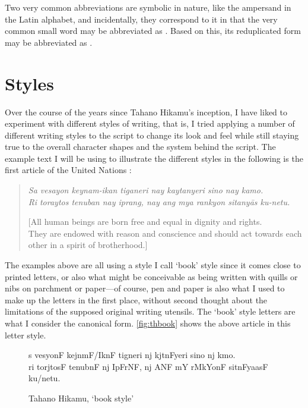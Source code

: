 Two very common abbreviations are symbolic in nature, like the ampersand 
\orth{\&} in the Latin alphabet, and incidentally, they correspond to it in 
that the very common small word  may be abbreviated as 
\rayr{\&}{\&}. Based on this, its reduplicated form 
 may be abbreviated as \ayr{+}.


\section{Styles}

Over the course of the years since Tahano Hikamu's inception, I have liked to 
experiment with different styles of writing, that is, I tried applying a 
number of different writing styles to the script to change its look and feel 
while still staying true to the overall character shapes and the system behind 
the script. The example text I will be using to illustrate the different styles 
in the following is the first article of the United Nations 
:

\blockcquote[Article 1]{udhr}{\textit{Sa vesayon keynam-ikan tiganeri nay
kaytanyeri sino nay kamo.\\
Ri toraytos tenuban nay iprang, nay ang mya rankyon sitanyās ku-netu.}

[All human beings are born free and equal in dignity and rights.\\
They are endowed with reason and conscience and should act towards each other 
in a spirit of brotherhood.]}

The examples above are all using a style I call `book' style since it 
comes close to printed letters, or also what might be conceivable as being 
written with quills or nibs on parchment or paper---of course, pen and paper is 
also what I used to make up the letters in the first place, without second 
thought about the limitations of the supposed original writing utensils. The 
`book' style letters are what I consider the canonical form. 
\autoref{fig:thbook} shows the above article in this letter style.

\begin{figure}[ht]\centering
\caption{Tahano Hikamu, `book style'}
{\Tagati\Large s vesyonF kejnmF/IknF tigneri nj kjtnFyeri sino nj kmo.\\
ri torjtosF tenubnF nj IpFrNF, nj ANF mY rMkYonF sitnFyaasF 
ku/netu.}
\label{fig:thbook}
\end{figure}

